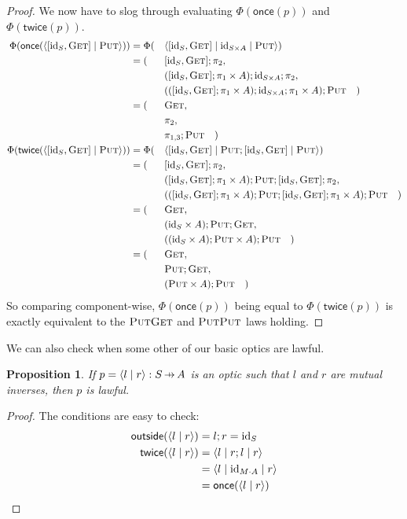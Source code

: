 \documentclass[11pt,letterpaper]{article}
\theoremstyle{plain}
\newtheorem{proposition}[theorem]{Proposition}
\theoremstyle{definition}
\newcommand{\id}{\mathrm{id}}
\newcommand{\act}{\cdot}
\newcommand{\rep}[2]{{\ensuremath \left\langle #1 \mid #2 \right\rangle}}
\newcommand{\repthree}[3]{{\ensuremath \langle #1 \mid #2 \mid #3 \rangle}}
\newcommand{\fget}{\textsc{Get}}
\newcommand{\fput}{\textsc{Put}}
\newcommand{\outside}{\mathsf{outside}}
\newcommand{\once}{\mathsf{once}}
\newcommand{\twice}{\mathsf{twice}}
\newcommand{\hto}{\ensuremath{\,\mathaccent\shortmid\rightarrow\,}}
\begin{document}
\begin{proof}
  We now have to slog through evaluating $\Phi(\once(p))$ and $\Phi(\twice(p))$.
  \begingroup
  \allowdisplaybreaks
  \begin{alignat*}{3}
    \Phi(\once(\rep{[\id_S, \fget]}{\fput})) &=
    \Phi(&&\repthree{[\id_S, \fget]}{\id_{S \times A}}{\fput}) \\
    &= (&& [\id_S, \fget];\pi_2, \\
    &&& ( [\id_S, \fget];\pi_1 \times A);\id_{S \times A};\pi_2, \\
    &&& (( [\id_S, \fget];\pi_1 \times A);\id_{S \times A};\pi_1 \times A) ; \fput \quad) \\
    &= (&&\fget, \\
    &&& \pi_2, \\
    &&& \pi_{1,3} ;\fput \quad) \\
    \Phi(\twice(\rep{[\id_S, \fget]}{\fput})) &=
    \Phi(&&\repthree{[\id_S, \fget]}{\fput;[\id_S, \fget]}{\fput}) \\
    &= (&& [\id_S, \fget];\pi_2, \\
    &&& ([\id_S, \fget];\pi_1  \times A);\fput;[\id_S, \fget];\pi_2, \\
    &&& (([\id_S, \fget];\pi_1  \times A);\fput;[\id_S, \fget];\pi_1 \times A);\fput \quad) \\
    &= (&&\fget, \\
    &&& (\id_S \times A);\fput;\fget, \\
    &&& ((\id_S \times A);\fput  \times A);\fput \quad) \\
    &= (&&\fget, \\
    &&& \fput;\fget, \\
    &&& (\fput \times A);\fput \quad)
  \end{alignat*}
  \endgroup
  So comparing component-wise, $\Phi(\once(p))$ being equal to $\Phi(\twice(p))$ is exactly equivalent to the $\fput\fget$ and $\fput\fput$ laws holding.
\end{proof}

We can also check when some other of our basic optics are lawful.

\begin{proposition}
If $p = \rep{l}{r} : S \hto A$ is an optic such that $l$ and $r$ are mutual inverses, then $p$ is lawful.
\end{proposition}
\begin{proof}
The conditions are easy to check:
\begin{align*}
\outside(\rep{l}{r}) &= l;r = \id_S \\
\twice(\rep{l}{r})
&= \repthree{l}{r;l}{r} \\
&= \repthree{l}{\id_{M\act A}}{r} \\
&= \once(\rep{l}{r})
\end{align*}
\end{proof}
\end{document}
